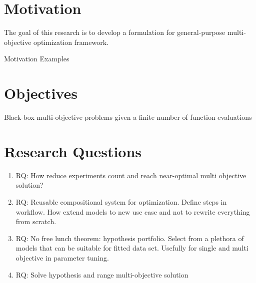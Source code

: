 \section{Motivation}
The goal of this research is to develop a formulation for
general-purpose multi-objective optimization framework. \cite{DBLP:journals/corr/abs-1812-07958}

Motivation Examples

\section{Objectives}
    Black-box multi-objective problems given a finite number of function evaluations

\section{Research Questions}
\begin{enumerate}
    \item RQ: How reduce experiments count and reach near-optimal multi objective solution?
    \item RQ: Reusable compositional system for optimization. Define steps in workflow. How extend models to new use case and not to rewrite everything from scratch.
    \item RQ: No free lunch theorem: hypothesis portfolio. Select from a plethora of models that can be suitable for fitted data set. Usefully for single and multi objective in parameter tuning.
    \item RQ: Solve hypothesis and range multi-objective solution
\end{enumerate}


